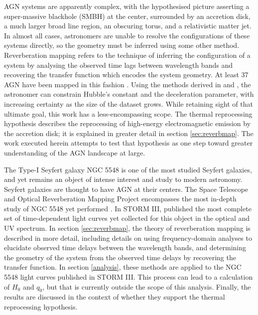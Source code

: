 \documentclass[11pt,letterpaper]{article}
\begin{document}
AGN systems are apparently complex, with the hypothesised picture asserting a super-massive blackhole (SMBH) at the center, surrounded by an accretion disk, a much larger broad line region, an obscuring torus, and a relativistic matter jet. In almost all cases, astronomers are unable to resolve the configurations of these systems directly, so the geometry must be inferred using some other method. Reverberation mapping refers to the technique of inferring the configuration of a system by analysing the observed time lags between wavelength bands and recovering the transfer function which encodes the system geometry. At least 37 AGN have been mapped in this fashion \citep{2016MNRAS.462..511K} \citep{2006pces.conf...89P}. Using the methods derived in \cite{1999MNRAS.302L..24C} and \cite{2007MNRAS.380..669C}, the astronomer can constrain Hubble's constant and the deceleration parameter, with increasing certainty as the size of the dataset grows. While retaining sight of that ultimate goal, this work has a less-encompassing scope. The thermal reprocessing hypothesis describes the reprocessing of high-energy electromagnetic emission by the accretion disk; it is explained in greater detail in section \ref{sec:reverbmap}. The work executed herein attempts to test that hypothesis as one step toward greater understanding of the AGN landscape at large.  

The Type-I Seyfert galaxy NGC 5548 is one of the most studied Seyfert galaxies, and yet remains an object of intense interest and study to modern astronomy. Seyfert galaxies are thought to have AGN at their centers. The Space Telescope and Optical Reverberation Mapping Project encompasses the most in-depth study of NGC 5548 yet performed \citep{2015ApJ...806..128D} \citep{2015ApJ...806..129E} \citep{2016ApJ...821...56F}. In STORM III, \cite{2016ApJ...821...56F} published the most complete set of time-dependent light curves yet collected for this object in the optical and UV spectrum. In section \ref{sec:reverbmap}, the theory of reverberation mapping is described in more detail, including details on using frequency-domain analyses to elucidate observed time delays between the wavelength bands, and determining the geometry of the system from the observed time delays by recovering the transfer function. In section \ref{analysis}, these methods are applied to the NGC 5548 light curves published in STORM III. This process can lead to a calculation of $H_0$ and $q_0$, but that is currently outside the scope of this analysis. Finally, the results are discussed in the context of whether they support the thermal reprocessing hypothesis.
\end{document}
